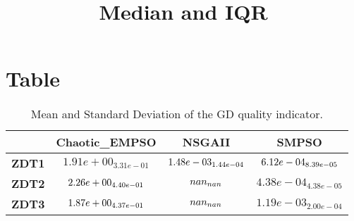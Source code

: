 \documentclass{article}
\title{Median and IQR}
\author{}
\begin{document}
\maketitle
\section{Table}
\begin{table}[!htp]
  \caption{Mean and Standard Deviation of the GD quality indicator.}
  \label{table:GD}
  \centering
  \begin{scriptsize}
  \begin{tabular}{c|ccc}
      & \textbf{Chaotic\_EMPSO} & \textbf{NSGAII} & \textbf{SMPSO} \\\hline
      \textbf{ZDT1} & $1.91e+00_{3.31e-01} $ & $ \cellcolor{gray25} 1.48e-03_{1.44e-04} $ & $ \cellcolor{gray95} 6.12e-04_{8.39e-05}$ \\
      \textbf{ZDT2} & $\cellcolor{gray95} 2.26e+00_{4.40e-01} $ & $ \cellcolor{gray25} nan_{nan} $ & $ 4.38e-04_{4.38e-05}$ \\
      \textbf{ZDT3} & $\cellcolor{gray95} 1.87e+00_{4.37e-01} $ & $ \cellcolor{gray25} nan_{nan} $ & $ 1.19e-03_{2.00e-04}$ \\
  \end{tabular}
  \end{scriptsize}
\end{table}
\end{document}
